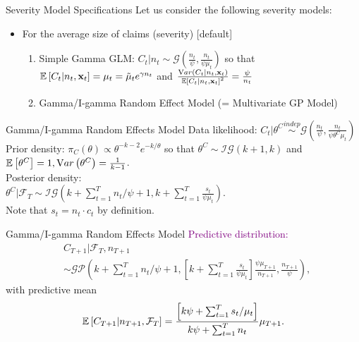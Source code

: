\documentclass[ignorenonframetext,]{beamer}
\begin{document}
\begin{frame}{Severity Model Specifications}
Let us consider the following severity models:
\begin{itemize}
	\item For the average size of claims (severity)
	[default]
	\begin{enumerate}[(1)]
		\item Simple Gamma GLM: $C_t|n_t \sim \mathcal{G}(\frac{n_t}{\psi}, \frac{n_t}{\psi\mu_t})$ so that ${\mathbb E}\left[C_t|n_t, \mathbf{x}_t\right] = \mu_t = \tilde{\mu}_t e^{\gamma n_t}$ and $\frac{{\mathrm Var}\left(C_t|n_t, \mathbf{x}_t\right)}{{\mathbb E}\left[C_t|n_t, \mathbf{x}_t\right]^2} = \frac{\psi}{n_t}$
		\item {\color{blue} Gamma/I-gamma Random Effect Model (= Multivariate GP Model)}
	\end{enumerate}
\end{itemize}
\end{frame}

\begin{frame}{Gamma/I-gamma Random Effects Model}
Data likelihood: $C_t|\theta^C \overset{indep}{\sim} \mathcal{G}\left(\frac{n_t}{\psi}, \frac{n_t}{\psi\theta^C\mu_t}\right)$ \\
Prior density: $\pi_C(\theta) \propto \theta^{-k-2}e^{-k/\theta}$ so that $\theta^C \sim \mathcal{IG}(k+1,k)$ and ${\mathbb E}\left[\theta^C\right]=1, {\mathrm Var}\left(\theta^C\right)=\frac{1}{k-1}$. \\
Posterior density: \\
$\theta^C|\mathcal{F}_T \sim \mathcal{IG}(k+\sum_{t=1}^T n_t/\psi + 1, k+\sum_{t=1}^T \frac{s_t}{\psi\mu_t})$. \\
Note that $s_t = n_t \cdot c_t$ by definition.
\end{frame}

\begin{frame}{Gamma/I-gamma Random Effects Model}
\textcolor{purple}{Predictive distribution:}
\begin{align*}
&C_{T+1}|\mathcal{F}_T, n_{T+1} \\
&\sim \mathcal{GP}\left(k + \sum_{t=1}^T n_t/\psi + 1, \left[k + \sum_{t=1}^T \frac{s_t}{\psi\mu_t}\right]\frac{\psi\mu_{T+1}}{n_{T+1}}, \frac{n_{T+1}}{\psi}\right),
\end{align*}
with predictive mean
$$
{\mathbb E}\left[C_{T+1}|n_{T+1}, \mathcal{F}_T\right] = \frac{\left[k\psi + \sum_{t=1}^T s_t/\mu_t\right]}{k\psi + \sum_{t=1}^T n_t}\mu_{T+1}.
$$
\end{frame}
\end{document}
